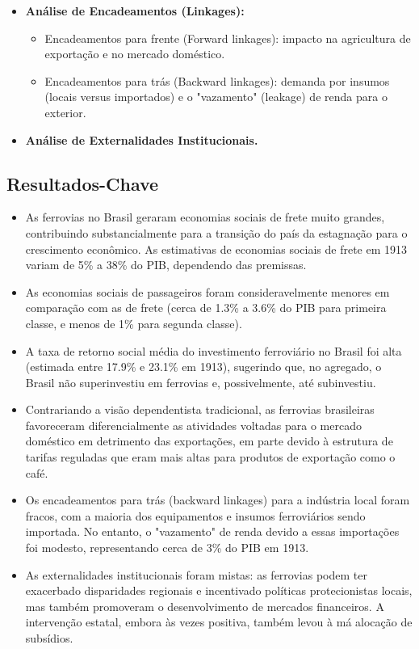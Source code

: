 \documentclass[12pt]{article}
\begin{document}
\begin{itemize}
\begin{itemize}
    \end{itemize}
    \item \textbf{Análise de Encadeamentos (Linkages):}
    \begin{itemize}
        \item Encadeamentos para frente (Forward linkages): impacto na agricultura de exportação e no mercado doméstico.
        \item Encadeamentos para trás (Backward linkages): demanda por insumos (locais versus importados) e o "vazamento" (leakage) de renda para o exterior.
    \end{itemize}
    \item \textbf{Análise de Externalidades Institucionais.}
\end{itemize}

\subsection*{Resultados-Chave}
\begin{itemize}
    \item As ferrovias no Brasil geraram economias sociais de frete muito grandes, contribuindo substancialmente para a transição do país da estagnação para o crescimento econômico. As estimativas de economias sociais de frete em 1913 variam de 5\% a 38\% do PIB, dependendo das premissas.
    \item As economias sociais de passageiros foram consideravelmente menores em comparação com as de frete (cerca de 1.3\% a 3.6\% do PIB para primeira classe, e menos de 1\% para segunda classe).
    \item A taxa de retorno social média do investimento ferroviário no Brasil foi alta (estimada entre 17.9\% e 23.1\% em 1913), sugerindo que, no agregado, o Brasil não superinvestiu em ferrovias e, possivelmente, até subinvestiu.
    \item Contrariando a visão dependentista tradicional, as ferrovias brasileiras favoreceram diferencialmente as atividades voltadas para o mercado doméstico em detrimento das exportações, em parte devido à estrutura de tarifas reguladas que eram mais altas para produtos de exportação como o café.
    \item Os encadeamentos para trás (backward linkages) para a indústria local foram fracos, com a maioria dos equipamentos e insumos ferroviários sendo importada. No entanto, o "vazamento" de renda devido a essas importações foi modesto, representando cerca de 3\% do PIB em 1913.
    \item As externalidades institucionais foram mistas: as ferrovias podem ter exacerbado disparidades regionais e incentivado políticas protecionistas locais, mas também promoveram o desenvolvimento de mercados financeiros. A intervenção estatal, embora às vezes positiva, também levou à má alocação de subsídios.
\end{itemize}
\end{document}
